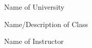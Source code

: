 \doublespacing{}

\vspace*{\fill}

\begin{center}

\textbf{\thetitle}

\vspace{0.5in}

\theauthor{}

Name of University

Name/Description of Class

Name of Instructor

\thedate{}

\end{center}

\vspace*{\fill}

\pagebreak
